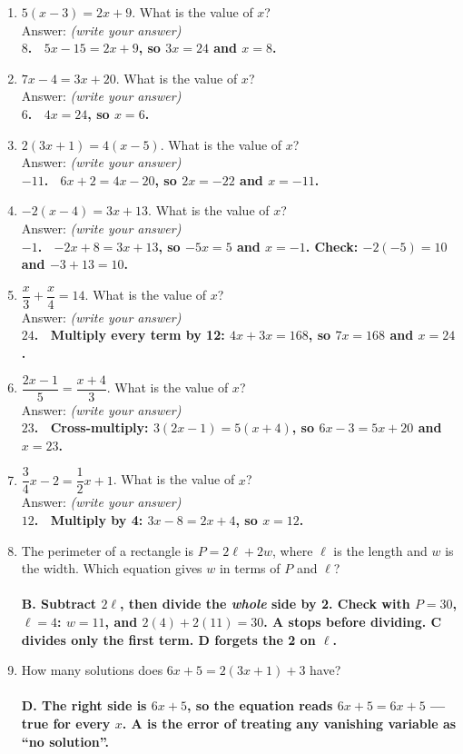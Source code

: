 \documentclass[11pt,a4paper]{article}
\newcommand{\spr}{\\[3pt]\hspace*{6pt}Answer: \underline{\hspace{3.2cm}}\hfill{\footnotesize\itshape(write your answer)}}
\newcommand{\ans}[1]{\ {\color{keyred}\bfseries #1}}
\newcommand{\ans}[1]{}
\begin{document}
\begin{enumerate}[leftmargin=20pt,itemsep=9pt]
\item $5(x-3)=2x+9$. What is the value of $x$? \spr
  \ans{\\ $8$. \ $5x-15=2x+9$, so $3x=24$ and $x=8$.}

\item $7x-4=3x+20$. What is the value of $x$? \spr
  \ans{\\ $6$. \ $4x=24$, so $x=6$.}

\item $2(3x+1)=4(x-5)$. What is the value of $x$? \spr
  \ans{\\ $-11$. \ $6x+2=4x-20$, so $2x=-22$ and $x=-11$.}

\item $-2(x-4)=3x+13$. What is the value of $x$? \spr
  \ans{\\ $-1$. \ $-2x+8=3x+13$, so $-5x=5$ and $x=-1$. Check: $-2(-5)=10$ and $-3+13=10$.}

\item $\dfrac{x}{3}+\dfrac{x}{4}=14$. What is the value of $x$? \spr
  \ans{\\ $24$. \ Multiply every term by 12: $4x+3x=168$, so $7x=168$ and $x=24$.}

\item $\dfrac{2x-1}{5}=\dfrac{x+4}{3}$. What is the value of $x$? \spr
  \ans{\\ $23$. \ Cross-multiply: $3(2x-1)=5(x+4)$, so $6x-3=5x+20$ and $x=23$.}

\item $\dfrac{3}{4}x-2=\dfrac{1}{2}x+1$. What is the value of $x$? \spr
  \ans{\\ $12$. \ Multiply by 4: $3x-8=2x+4$, so $x=12$.}

\item The perimeter of a rectangle is $P=2\ell+2w$, where $\ell$ is the length and $w$ is
  the width. Which equation gives $w$ in terms of $P$ and $\ell$?\\
  \ans{\\ B. Subtract $2\ell$, then divide the \emph{whole} side by 2. Check with $P=30$,
  $\ell=4$: $w=11$, and $2(4)+2(11)=30$. A stops before dividing. C divides only the
  first term. D forgets the 2 on $\ell$.}

\item How many solutions does $6x+5=2(3x+1)+3$ have?\\
  \ans{\\ D. The right side is $6x+5$, so the equation reads $6x+5=6x+5$ --- true for
  every $x$. A is the error of treating any vanishing variable as ``no solution''.}


\end{enumerate}
\end{document}
